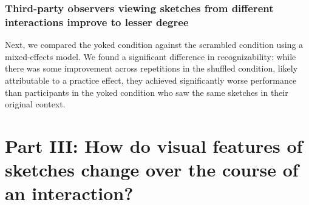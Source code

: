 \documentclass[10pt,letterpaper]{article}
\begin{document}



\subsubsection{Third-party observers viewing sketches from different interactions improve to lesser degree}




Next, we compared the yoked condition against the scrambled condition using a mixed-effects model.
We found a significant difference in recognizability: while there was some improvement across repetitions in the shuffled condition, likely attributable to a practice effect, they achieved significantly worse performance than participants in the yoked condition who saw the same sketches in their original context. 


\section{Part III: How do visual features of sketches change over the course of an interaction?}
\end{document}
